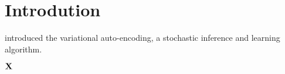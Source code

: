 \section{Introdution}

\cite{kingma2022autoencoding} introduced the variational auto-encoding, a stochastic inference and learning algorithm.

$\textbf{X}$

\cite{Higgins2016betaVAELB}

